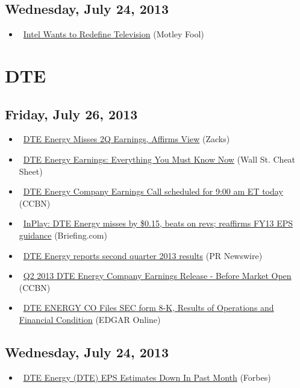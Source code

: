 \documentclass[11pt,asymmetric]{article}
\begin{document}
\subsection*{Wednesday, July 24, 2013}
\begin{itemize}
\item\ \href{http://www.fool.com/investing/general/2013/07/24/intel-wants-to-redefine-television.aspx?source=eogyholnk0000001}{Intel Wants to Redefine Television} (Motley Fool)
\end{itemize}

\section*{DTE}

\subsection*{Friday, July 26, 2013}
\begin{itemize}
\item\ \href{http://finance.yahoo.com/news/dte-energy-misses-2q-earnings-202002783.html}{DTE Energy Misses 2Q Earnings, Affirms View} (Zacks)
\item\ \href{http://wallstcheatsheet.com/stocks/dte-energy-earnings-everything-you-must-know-now.html/?ref=YF}{DTE Energy Earnings: Everything You Must Know Now} (Wall St. Cheat Sheet)
\item\ \href{http://biz.yahoo.com/cc/3/139563.html}{DTE Energy Company Earnings Call scheduled for 9:00 am ET today} (CCBN)
\item\ \href{http://finance.yahoo.com/mp#dte}{InPlay: DTE Energy misses by \$0.15, beats on revs; reaffirms FY13 EPS guidance} (Briefing.com)
\item\ \href{http://finance.yahoo.com/news/dte-energy-reports-second-quarter-111000661.html}{DTE Energy reports second quarter 2013 results} (PR Newswire)
\item\ \href{http://biz.yahoo.com/research/earncal/20130726.html?t=dte}{Q2 2013 DTE Energy Company Earnings Release - Before Market Open} (CCBN)
\item\ \href{http://biz.yahoo.com/e/130726/dte8-k.html}{DTE ENERGY CO Files SEC form 8-K, Results of Operations and Financial Condition} (EDGAR Online)
\end{itemize}
\subsection*{Wednesday, July 24, 2013}
\begin{itemize}
\item\ \href{http://www.forbes.com/sites/narrativescience/2013/07/24/dte-energy-dte-eps-estimates-down-in-past-month/?partner=yahootix}{DTE Energy (DTE) EPS Estimates Down In Past Month} (Forbes)
\end{itemize}
\end{document}

